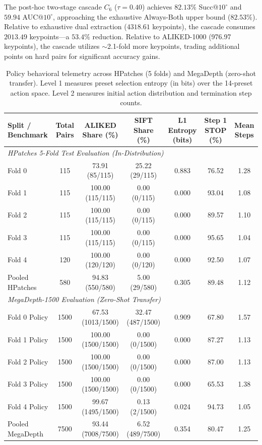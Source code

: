 \documentclass[conference]{IEEEtran}
\begin{document}
The post-hoc two-stage cascade $C_6$ ($\tau = 0.40$) achieves $82.13\%$ Succ@$10^\circ$ and $59.94$ AUC@$10^\circ$, approaching the exhaustive Always-Both upper bound ($82.53\%$). Relative to exhaustive dual extraction ($4318.61$ keypoints), the cascade consumes $2013.49$ keypoints---a $53.4\%$ reduction. Relative to ALIKED-1000 (976.97 keypoints), the cascade utilizes $\sim$2.1-fold more keypoints, trading additional points on hard pairs for significant accuracy gains.

\begin{table}[t]
\centering
\caption{Policy behavioral telemetry across HPatches (5 folds) and MegaDepth (zero-shot transfer). Level 1 measures preset selection entropy (in bits) over the 14-preset action space. Level 2 measures initial action distribution and termination step counts.}
\label{tab:policy_behaviour}
\small
\begin{tabular}{lcccccc}
\hline
\textbf{Split / Benchmark} & \textbf{Total Pairs} & \textbf{ALIKED Share (\%)} & \textbf{SIFT Share (\%)} & \textbf{L1 Entropy (bits)} & \textbf{Step 1 STOP (\%)} & \textbf{Mean Steps} \\
\hline
\multicolumn{7}{l}{\textit{HPatches 5-Fold Test Evaluation (In-Distribution)}} \\
Fold 0 & 115 & 73.91 (85/115) & 25.22 (29/115) & 0.883 & 76.52 & 1.28 \\
Fold 1 & 115 & 100.00 (115/115) & 0.00 (0/115) & 0.000 & 93.04 & 1.08 \\
Fold 2 & 115 & 100.00 (115/115) & 0.00 (0/115) & 0.000 & 89.57 & 1.10 \\
Fold 3 & 115 & 100.00 (115/115) & 0.00 (0/115) & 0.000 & 95.65 & 1.04 \\
Fold 4 & 120 & 100.00 (120/120) & 0.00 (0/120) & 0.000 & 92.50 & 1.07 \\
Pooled HPatches & 580 & 94.83 (550/580) & 5.00 (29/580) & 0.305 & 89.48 & 1.12 \\
\hline
\multicolumn{7}{l}{\textit{MegaDepth-1500 Evaluation (Zero-Shot Transfer)}} \\
Fold 0 Policy & 1500 & 67.53 (1013/1500) & 32.47 (487/1500) & 0.909 & 67.80 & 1.57 \\
Fold 1 Policy & 1500 & 100.00 (1500/1500) & 0.00 (0/1500) & 0.000 & 87.27 & 1.13 \\
Fold 2 Policy & 1500 & 100.00 (1500/1500) & 0.00 (0/1500) & 0.000 & 87.00 & 1.13 \\
Fold 3 Policy & 1500 & 100.00 (1500/1500) & 0.00 (0/1500) & 0.000 & 65.53 & 1.38 \\
Fold 4 Policy & 1500 & 99.67 (1495/1500) & 0.13 (2/1500) & 0.024 & 94.73 & 1.05 \\
Pooled MegaDepth & 7500 & 93.44 (7008/7500) & 6.52 (489/7500) & 0.354 & 80.47 & 1.25 \\
\hline
\end{tabular}
\end{table}
\end{document}
